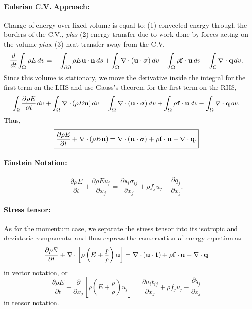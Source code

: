 \documentclass[oneside,a4paper,11pt]{report}
\begin{document}
\paragraph{Eulerian C.V. Approach:}
Change of energy over fixed volume is equal to: (1) convected energy through the borders of the C.V., \textit{plus} (2) energy transfer due to work done by forces acting on the volume \textit{plus}, (3) heat transfer away from the C.V.
\begin{equation}
\frac{d}{dt}\int_\Omega \rho E \,dv=-\int_{\partial \Omega} \rho E \mathbf{u} \cdot \mathbf{n} \, ds + \int_{\Omega} \nabla \cdot (\mathbf{u} \cdot \boldsymbol{\sigma}) \,dv + \int_{\Omega} \rho \mathbf{f} \cdot \mathbf{u} \,dv - \int_{\Omega} \nabla \cdot \mathbf{q} \, dv.
\end{equation}
Since this volume is stationary, we move the derivative inside the integral for the first term on the LHS and use Gauss's theorem for the first term on the RHS,
\begin{equation}
\int_\Omega \frac{\partial \rho E}{\partial t}\,dv + \int_\Omega \nabla \cdot (\rho E \mathbf{u}) \,dv = \int_\Omega \nabla \cdot ( \mathbf{u} \cdot \boldsymbol{\sigma} ) \,dv + \int_\Omega \rho \mathbf{f} \cdot \mathbf{u} \,dv - \int_\Omega \nabla \cdot \mathbf{q}\,dv.
\end{equation}
Thus,
\begin{equation}
    \label{eq:energy_conservation_vector}
    \boxed{\frac{\partial \rho E}{\partial t} + \nabla \cdot (\rho E \mathbf{u} ) = \nabla\cdot(\mathbf{u} \cdot \boldsymbol{\sigma}) + \rho \mathbf{f} \cdot \mathbf{u} - \nabla\cdot\mathbf{q}.}
\end{equation}

\paragraph{Einstein Notation:}
\begin{equation}
    \label{eq:energy_conservation_tensor}
    \boxed{\frac{\partial \rho E}{\partial t} + \frac{\partial \rho E u_j}{\partial x_j} = \frac{\partial u_i\sigma_{ij}}{\partial x_j} + \rho f_j u_j - \frac{\partial q_j}{\partial x_j}.}
\end{equation}

\paragraph{Stress tensor:}
As for the momentum case, we separate the stress tensor into its isotropic and deviatoric components, and thus express the conservation of energy equation as 
\begin{equation}
    \frac{\partial \rho E}{\partial t} + \nabla \cdot \left [\rho \left ( E  + \frac{p}{\rho} \right ) \mathbf{u} \right] = \nabla\cdot(\mathbf{u} \cdot \mathbf{t} ) + \rho \mathbf{f} \cdot \mathbf{u} - \nabla \cdot \mathbf{q}
\end{equation}
in vector notation, or 
\begin{equation}
    \frac{\partial \rho E}{\partial t} + \frac{\partial}{\partial x_j} \left [ \rho \left ( E + \frac{p}{\rho} \right ) u_j \right ] = \frac{\partial u_i t_{ij}}{\partial x_j} + \rho f_j u_j - \frac{\partial q_j}{\partial x_j}
\end{equation}
in tensor notation.
\end{document}
